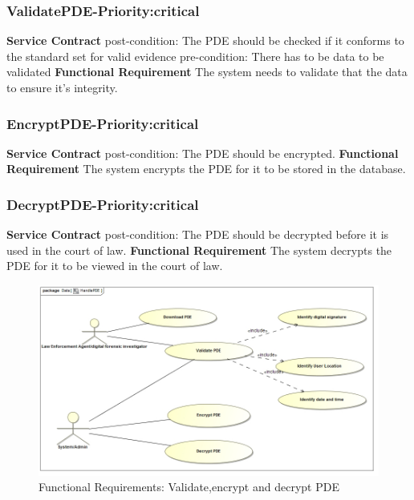 \documentclass[a4paper,12pt]{article}
\begin{document}
\subsubsection{ValidatePDE-Priority:critical}
\textbf{Service Contract}\newline
post-condition: The PDE should be checked if it conforms to the standard set for valid evidence\newline
pre-condition: There has to be data to be validated\newline
\textbf{Functional Requirement}\newline
The system needs to validate that the data to ensure it's integrity.\newline
\subsubsection{EncryptPDE-Priority:critical}
\textbf{Service Contract}\newline
post-condition: The PDE should be encrypted.\newline
\textbf{Functional Requirement}\newline
	The system encrypts the PDE for it to be stored in the database.\newline
\subsubsection{DecryptPDE-Priority:critical}
\textbf{Service Contract}\newline
post-condition: The PDE should be decrypted before it is used in the court of law.\newline
\textbf{Functional Requirement}\newline
The system decrypts the PDE for it to be viewed in the court of law.\newline
\begin{figure}[H]
\includegraphics[width=\textwidth]{images/HandlePDE.jpg}
\caption{Functional Requirements: Validate,encrypt and decrypt PDE\label{overflow}}
\end{figure}
\end{document}
